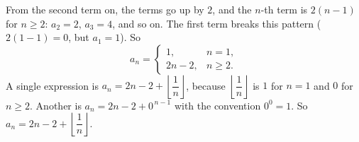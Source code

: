 From the second term on, the terms go up by $2$, and the $n$-th term is $2(n-1)$ for $n\ge2$: $a_2=2$, $a_3=4$, and so on. The first term breaks this pattern ($2(1-1)=0$, but $a_1=1$). So
\[
a_n=\begin{cases}1,&n=1,\\ 2n-2,&n\ge2.\end{cases}
\]
A single expression is $a_n=2n-2+\left\lfloor\dfrac{1}{n}\right\rfloor$, because $\left\lfloor\dfrac{1}{n}\right\rfloor$ is $1$ for $n=1$ and $0$ for $n\ge2$. Another is $a_n=2n-2+0^{\,n-1}$ with the convention $0^0=1$. So $\boxed{a_n=2n-2+\left\lfloor\dfrac{1}{n}\right\rfloor}$.
